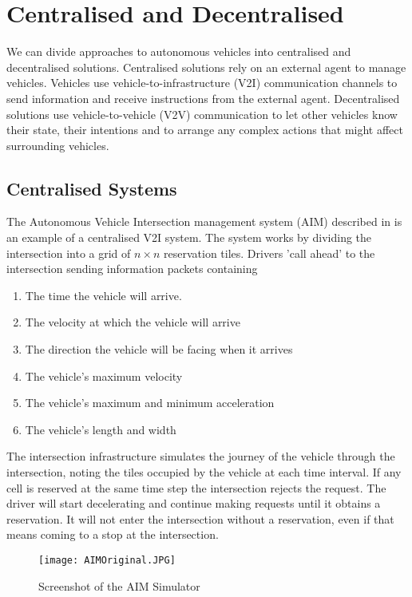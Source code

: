 \section{Centralised and Decentralised}
\label{sec:Centralised and Decentralised}

We can divide approaches to autonomous vehicles into centralised and decentralised solutions. Centralised solutions rely on an external agent to manage vehicles. Vehicles use vehicle-to-infrastructure (V2I) communication channels to send information and receive instructions from the external agent. Decentralised solutions use vehicle-to-vehicle (V2V) communication to let other vehicles know their state, their intentions and to arrange any complex actions that might affect surrounding vehicles.

\subsection{Centralised Systems}
\label{subsec:Centralised Systems}
The Autonomous Vehicle Intersection management system (AIM) described in \citep{Dresner2004} is an example of a centralised V2I system. The system works by dividing the intersection into a grid of $n \times n$ reservation tiles. Drivers 'call ahead' to the intersection sending information packets containing

\begin{enumerate}
\item The time the vehicle will arrive.
\item The velocity at which the vehicle will arrive
\item The direction the vehicle will be facing when it arrives
\item The vehicle's maximum velocity
\item The vehicle's maximum and minimum acceleration
\item The vehicle's length and width
\end{enumerate}

The intersection infrastructure simulates the journey of the vehicle through the intersection, noting the tiles occupied by the vehicle at each time interval. If any cell is reserved at the same time step the intersection rejects the request. The driver will start decelerating and continue making requests until it obtains a reservation. It will not enter the intersection without a reservation, even if that means coming to a stop at the intersection.

\begin{figure}[htb]
\texttt{[image: AIMOriginal.JPG]}
\caption{Screenshot of the AIM Simulator}
\label{fig:AIMOriginal}
\end{figure}

